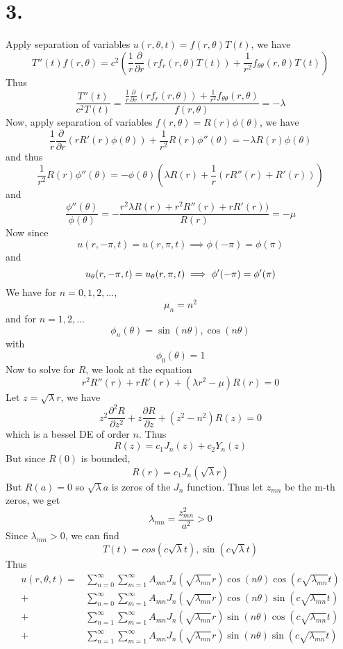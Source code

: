 \documentclass[11pt]{article}
\theoremstyle{mystyle}
\theoremstyle{definition}
\begin{document}
\section*{3.}
Apply separation of variables $u(r, \theta, t) = f(r, \theta) T(t)$, we have 
\[
  T''(t) f(r, \theta) = c^2 \left(\displaystyle\frac{1}{r} \displaystyle\frac{\partial}{\partial r} \left( r f_r(r, \theta) T(t)\right) + \displaystyle\frac{1}{r^2} f_{\theta \theta}(r, \theta)T(t)\right)
\]
Thus 
\[
  \displaystyle\frac{T''(t)}{c^2 T(t)} = \displaystyle\frac{\displaystyle\frac{1}{r} \displaystyle\frac{\partial}{\partial r} (r f_r(r, \theta)) + \displaystyle\frac{1}{r^2}f_{\theta \theta}(r, \theta)}{f(r, \theta)} = -\lambda
\]
Now, apply separation of variables $f(r, \theta) = R(r) \phi(\theta)$, we have 
\[
  \displaystyle\frac{1}{r} \displaystyle\frac{\partial}{\partial r} (rR'(r) \phi(\theta)) + \displaystyle\frac{1}{r^2} R(r) \phi''(\theta) = - \lambda R(r) \phi(\theta) 
\]
and thus 
\[
  \displaystyle\frac{1}{r^2} R(r) \phi''(\theta) = - \phi(\theta) \left(\lambda R(r) + \displaystyle\frac{1}{r} (rR''(r) + R'(r)) \right)
\]
and 
\[
  \displaystyle\frac{\phi''(\theta)}{\phi(\theta)} = -\displaystyle\frac{ r^2\lambda R(r) + r^2R''(r) + rR'(r))}{R(r)} =  -\mu 
\]
Now since 
\[
  u(r, -\pi, t) = u(r, \pi, t) \implies \phi(-\pi) = \phi(\pi) 
\]
and 
\[
  u_\theta(r, -\pi, t) = u_\theta(r, \pi, t) \implies \phi'(-\pi) = \phi'(\pi) \\
\]
We have for $n = 0,1,2, \hdots$, 
\[
  \mu_n = n^2 
\]
and for $n=1,2,\hdots$
\[
  \phi_n(\theta) = \sin(n\theta), \cos(n\theta)
\]
with 
\[
  \phi_0(\theta) = 1
\]
Now to solve for $R$, we look at the equation 
\[
  r^2R''(r) + rR'(r) + \left(\lambda r^2 - \mu \right) R(r) = 0
\]
Let $z = \sqrt{\lambda }r$, we have 
\[
  z^2\displaystyle\frac{\partial^2 R}{\partial z^2} + z \displaystyle\frac{\partial R}{\partial z} + \left(z^2 - n^2 \right) R(z) = 0
\]
which is a bessel DE of order $n$. Thus 
\[
  R(z) = c_1 J_n(z) + c_2 Y_n(z)
\]
But since $R(0)$ is bounded, 
\[
  R(r) = c_1 J_n(\sqrt{\lambda }r)
\]
But $R(a) = 0$ so $\sqrt{\lambda} a$ is zeros of the $J_n$ function. Thus let $z_{mn}$ be the m-th zeros, we get 
\[
  \lambda_{mn} = \displaystyle\frac{z^2_{mn}}{a^2} > 0
\]
Since $\lambda_{mn} > 0$, we can find 
\[
  T(t) = cos( c\sqrt{\lambda}t), \sin(c\sqrt{\lambda}t)
\]
Thus 
\begin{align*}
  u(r, \theta, t) 
  =& \sum_{n=0}^\infty \sum_{m=1}^\infty A_{mn} J_n(\sqrt{\lambda_{mn}}r) \cos(n \theta) \cos(c \sqrt{\lambda_{mn}}t) \\
  +&\sum_{n=0}^\infty \sum_{m=1}^\infty A_{mn} J_n(\sqrt{\lambda_{mn}}r) \cos(n \theta) \sin(c \sqrt{\lambda_{mn}}t) \\
  +&\sum_{n=1}^\infty \sum_{m=1}^\infty A_{mn} J_n(\sqrt{\lambda_{mn}}r) \sin(n \theta) \cos(c \sqrt{\lambda_{mn}}t) \\
  +&\sum_{n=1}^\infty \sum_{m=1}^\infty A_{mn} J_n(\sqrt{\lambda_{mn}}r) \sin(n \theta) \sin(c \sqrt{\lambda_{mn}}t)
\end{align*}
\newpage
\end{document}
